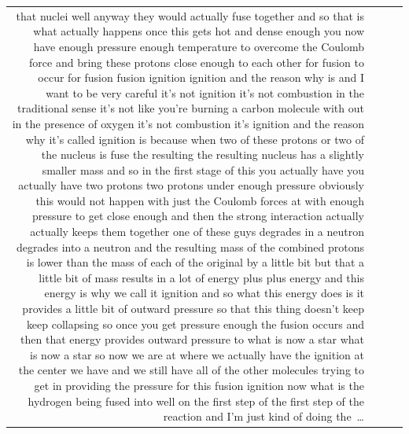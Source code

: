 \documentclass[10pt]{article}
\begin{document}
\begin{tiny}
\begin{longtable}{r p{0.3in} p{1.212in} p{3.8in}}
that nuclei well anyway they would actually fuse together and so that is what actually happens once this gets hot and dense enough you now have enough pressure enough temperature to overcome the Coulomb force and bring these protons close enough to each other for fusion to occur for fusion fusion ignition ignition and the reason why is and I want to be very careful it's not ignition it's not combustion in the traditional sense it's not like you're burning a carbon molecule with out in the presence of oxygen it's not combustion it's ignition and the reason why it's called ignition is because when two of these protons or two of the nucleus is fuse the resulting the resulting nucleus has a slightly smaller mass and so in the first stage of this you actually have you actually have two protons two protons under enough pressure obviously this would not happen with just the Coulomb forces at with enough pressure to get close enough and then the strong interaction actually actually keeps them together one of these guys degrades in a neutron degrades into a neutron and the resulting mass of the combined protons is lower than the mass of each of the original by a little bit but that a little bit of mass results in a lot of energy plus plus energy and this energy is why we call it ignition and so what this energy does is it provides a little bit of outward pressure so that this thing doesn't keep keep collapsing so once you get pressure enough the fusion occurs and then that energy provides outward pressure to what is now a star what is now a star so now we are at where we actually have the ignition at the center we have and we still have all of the other molecules trying to get in providing the pressure for this fusion ignition now what is the hydrogen being fused into well on the first step of the first step of the reaction and I'm just kind of doing the~\ldots \\

\end{longtable}
\end{tiny}
\end{document}
